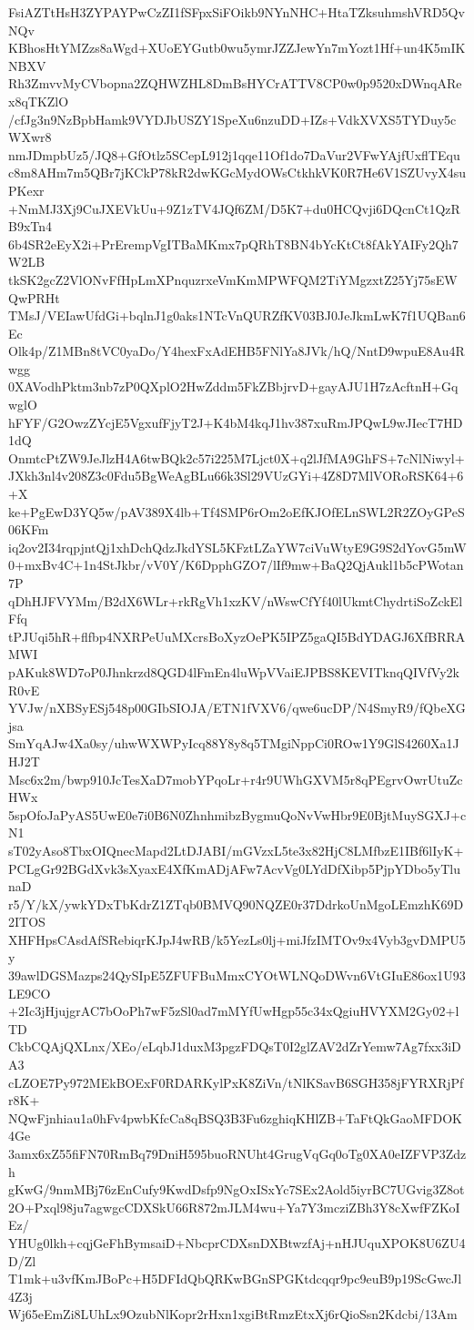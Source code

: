 FsiAZTtHsH3ZYPAYPwCzZI1fSFpxSiFOikb9NYnNHC+HtaTZksuhmshVRD5QvNQv
KBhosHtYMZzs8aWgd+XUoEYGutb0wu5ymrJZZJewYn7mYozt1Hf+un4K5mIKNBXV
Rh3ZmvvMyCVbopna2ZQHWZHL8DmBsHYCrATTV8CP0w0p9520xDWnqARex8qTKZlO
/cfJg3n9NzBpbHamk9VYDJbUSZY1SpeXu6nzuDD+IZs+VdkXVXS5TYDuy5cWXwr8
nmJDmpbUz5/JQ8+GfOtlz5SCepL912j1qqe11Of1do7DaVur2VFwYAjfUxflTEqu
c8m8AHm7m5QBr7jKCkP78kR2dwKGcMydOWsCtkhkVK0R7He6V1SZUvyX4suPKexr
+NmMJ3Xj9CuJXEVkUu+9Z1zTV4JQf6ZM/D5K7+du0HCQvji6DQcnCt1QzRB9xTn4
6b4SR2eEyX2i+PrErempVgITBaMKmx7pQRhT8BN4bYcKtCt8fAkYAIFy2Qh7W2LB
tkSK2gcZ2VlONvFfHpLmXPnquzrxeVmKmMPWFQM2TiYMgzxtZ25Yj75sEWQwPRHt
TMsJ/VEIawUfdGi+bqlnJ1g0aks1NTcVnQURZfKV03BJ0JeJkmLwK7f1UQBan6Ec
Olk4p/Z1MBn8tVC0yaDo/Y4hexFxAdEHB5FNlYa8JVk/hQ/NntD9wpuE8Au4Rwgg
0XAVodhPktm3nb7zP0QXplO2HwZddm5FkZBbjrvD+gayAJU1H7zAcftnH+GqwglO
hFYF/G2OwzZYcjE5VgxufFjyT2J+K4bM4kqJ1hv387xuRmJPQwL9wJIecT7HD1dQ
OnmtcPtZW9JeJlzH4A6twBQk2c57i225M7Ljct0X+q2lJfMA9GhFS+7cNlNiwyl+
JXkh3nl4v208Z3c0Fdu5BgWeAgBLu66k3Sl29VUzGYi+4Z8D7MlVORoRSK64+6+X
ke+PgEwD3YQ5w/pAV389X4lb+Tf4SMP6rOm2oEfKJOfELnSWL2R2ZOyGPeS06KFm
iq2ov2I34rqpjntQj1xhDchQdzJkdYSL5KFztLZaYW7ciVuWtyE9G9S2dYovG5mW
0+mxBv4C+1n4StJkbr/vV0Y/K6DpphGZO7/lIf9mw+BaQ2QjAukl1b5cPWotan7P
qDhHJFVYMm/B2dX6WLr+rkRgVh1xzKV/nWswCfYf40lUkmtChydrtiSoZckElFfq
tPJUqi5hR+flfbp4NXRPeUuMXcrsBoXyzOePK5IPZ5gaQI5BdYDAGJ6XfBRRAMWI
pAKuk8WD7oP0Jhnkrzd8QGD4lFmEn4luWpVVaiEJPBS8KEVITknqQIVfVy2kR0vE
YVJw/nXBSyESj548p00GIbSIOJA/ETN1fVXV6/qwe6ucDP/N4SmyR9/fQbeXGjsa
SmYqAJw4Xa0sy/uhwWXWPyIcq88Y8y8q5TMgiNppCi0ROw1Y9GlS4260Xa1JHJ2T
Msc6x2m/bwp910JcTesXaD7mobYPqoLr+r4r9UWhGXVM5r8qPEgrvOwrUtuZcHWx
5spOfoJaPyAS5UwE0e7i0B6N0ZhnhmibzBygmuQoNvVwHbr9E0BjtMuySGXJ+cN1
sT02yAso8TbxOIQnecMapd2LtDJABI/mGVzxL5te3x82HjC8LMfbzE1IBf6lIyK+
PCLgGr92BGdXvk3sXyaxE4XfKmADjAFw7AcvVg0LYdDfXibp5PjpYDbo5yTlunaD
r5/Y/kX/ywkYDxTbKdrZ1ZTqb0BMVQ90NQZE0r37DdrkoUnMgoLEmzhK69D2ITOS
XHFHpsCAsdAfSRebiqrKJpJ4wRB/k5YezLs0lj+miJfzIMTOv9x4Vyb3gvDMPU5y
39awlDGSMazps24QySIpE5ZFUFBuMmxCYOtWLNQoDWvn6VtGIuE86ox1U93LE9CO
+2Ic3jHjujgrAC7bOoPh7wF5zSl0ad7mMYfUwHgp55c34xQgiuHVYXM2Gy02+lTD
CkbCQAjQXLnx/XEo/eLqbJ1duxM3pgzFDQsT0I2glZAV2dZrYemw7Ag7fxx3iDA3
cLZOE7Py972MEkBOExF0RDARKylPxK8ZiVn/tNlKSavB6SGH358jFYRXRjPfr8K+
NQwFjnhiau1a0hFv4pwbKfcCa8qBSQ3B3Fu6zghiqKHlZB+TaFtQkGaoMFDOK4Ge
3amx6xZ55fiFN70RmBq79DniH595buoRNUht4GrugVqGq0oTg0XA0eIZFVP3Zdzh
gKwG/9nmMBj76zEnCufy9KwdDsfp9NgOxISxYc7SEx2Aold5iyrBC7UGvig3Z8ot
2O+Pxql98ju7agwgcCDXSkU66R872mJLM4wu+Ya7Y3mcziZBh3Y8cXwfFZKoIEz/
YHUg0lkh+cqjGeFhBymsaiD+NbcprCDXsnDXBtwzfAj+nHJUquXPOK8U6ZU4D/Zl
T1mk+u3vfKmJBoPc+H5DFIdQbQRKwBGnSPGKtdcqqr9pc9euB9p19ScGwcJl4Z3j
Wj65eEmZi8LUhLx9OzubNlKopr2rHxn1xgiBtRmzEtxXj6rQioSsn2Kdcbi/13Am
